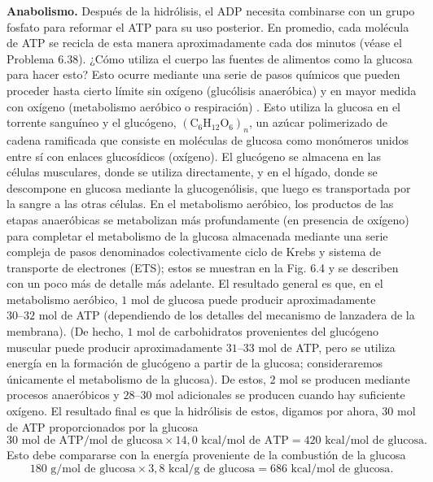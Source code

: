 \documentclass[12pt]{book}
\begin{document}
\textbf{Anabolismo.} Después de la hidrólisis, el ADP necesita combinarse con un grupo fosfato para reformar el ATP para su uso posterior. En promedio, cada molécula de ATP se recicla de esta manera aproximadamente cada dos minutos (véase el Problema 6.38). ¿Cómo utiliza el cuerpo las fuentes de alimentos como la glucosa para hacer esto? Esto ocurre mediante una serie de pasos químicos que pueden proceder hasta cierto límite sin oxígeno (glucólisis anaeróbica) y en mayor medida con oxígeno (metabolismo aeróbico o respiración) \cite{20,35,57,75,106}. Esto utiliza la glucosa en el torrente sanguíneo y el glucógeno, $(\text{C}_6\text{H}_{12}\text{O}_6)_n$, un azúcar polimerizado de cadena ramificada que consiste en moléculas de glucosa como monómeros unidos entre sí con enlaces glucosídicos (oxígeno). El glucógeno se almacena en las células musculares, donde se utiliza directamente, y en el hígado, donde se descompone en glucosa mediante la glucogenólisis, que luego es transportada por la sangre a las otras células. En el metabolismo aeróbico, los productos de las etapas anaeróbicas se metabolizan más profundamente (en presencia de oxígeno) para completar el metabolismo de la glucosa almacenada mediante una serie compleja de pasos denominados colectivamente ciclo de Krebs y sistema de transporte de electrones (ETS); estos se muestran en la Fig. 6.4 y se describen con un poco más de detalle más adelante. El resultado general es que, en el metabolismo aeróbico, $1\text{ mol}$ de glucosa puede producir aproximadamente $30\text{--}32\text{ mol}$ de ATP (dependiendo de los detalles del mecanismo de lanzadera de la membrana). (De hecho, $1\text{ mol}$ de carbohidratos provenientes del glucógeno muscular puede producir aproximadamente $31\text{--}33\text{ mol}$ de ATP, pero se utiliza energía en la formación de glucógeno a partir de la glucosa; consideraremos únicamente el metabolismo de la glucosa). De estos, $2\text{ mol}$ se producen mediante procesos anaeróbicos y $28\text{--}30\text{ mol}$ adicionales se producen cuando hay suficiente oxígeno. El resultado final es que la hidrólisis de estos, digamos por ahora, $30\text{ mol}$ de ATP proporcionados por la glucosa
\begin{equation}
30\text{ mol de ATP/mol de glucosa} \times 14,0\text{ kcal/mol de ATP} = 420\text{ kcal/mol de glucosa}.
\label{eq:614}
\end{equation}
Esto debe compararse con la energía proveniente de la combustión de la glucosa
\begin{equation}
180\text{ g/mol de glucosa} \times 3,8\text{ kcal/g de glucosa} = 686\text{ kcal/mol de glucosa}.
\label{eq:615}
\end{equation}
\end{document}
